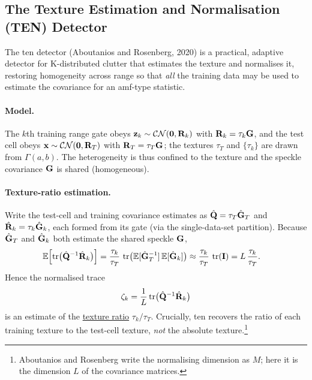 \documentclass{article}
\begin{document}
\subsection{The Texture Estimation and Normalisation (TEN) Detector}
\label{sec:ten}
The \gls{ten} detector (Aboutanios and Rosenberg, 2020) is a practical, adaptive detector for K-distributed clutter that estimates the texture and normalises it, restoring homogeneity across range so that \emph{all} the training data may be used to estimate the covariance for an \gls{amf}-type statistic.

\paragraph{Model.}
The $k$th training range gate obeys $\vb z_k\sim\mathcal{CN}(\vb 0,\mathbf{R}_k)$ with $\mathbf{R}_k=\tau_k\mathbf{G}$, and the test cell obeys $\vb x\sim\mathcal{CN}(\vb 0,\mathbf{R}_T)$ with $\mathbf{R}_T=\tau_T\mathbf{G}$; the textures $\tau_T$ and $\{\tau_k\}$ are drawn from $\Gamma(a,b)$. The heterogeneity is thus confined to the texture and the speckle covariance $\mathbf{G}$ is shared (homogeneous).

\paragraph{Texture-ratio estimation.}
Write the test-cell and training covariance estimates as $\hat{\mathbf{Q}}=\tau_T\hat{\mathbf{G}}_T$ and $\hat{\mathbf{R}}_k=\tau_k\hat{\mathbf{G}}_k$, each formed from its gate (via the single-data-set partition). Because $\hat{\mathbf{G}}_T$ and $\hat{\mathbf{G}}_k$ both estimate the shared speckle $\mathbf{G}$,
\begin{align}
  \mathbb{E}\!\left[\operatorname{tr}\!\big(\hat{\mathbf{Q}}^{-1}\hat{\mathbf{R}}_k\big)\right]
     &= \frac{\tau_k}{\tau_T}\,\operatorname{tr}\!\big(\mathbb{E}[\hat{\mathbf{G}}_T^{-1}]\,
        \mathbb{E}[\hat{\mathbf{G}}_k]\big)
      \approx \frac{\tau_k}{\tau_T}\,\operatorname{tr}(\mathbf{I})
      = L\,\frac{\tau_k}{\tau_T}. \nonumber
\end{align}
Hence the normalised trace
$$\zeta_k=\frac{1}{L}\operatorname{tr}\!\big(\hat{\mathbf{Q}}^{-1}\hat{\mathbf{R}}_k\big)$$ is an estimate of the \underline{texture ratio} $\tau_k/\tau_T$. Crucially, \gls{ten} recovers the ratio of each training texture to the test-cell texture, \emph{not} the absolute texture.\footnote{Aboutanios and Rosenberg write the normalising dimension as $M$; here it is the dimension $L$ of the covariance matrices.}
\end{document}
